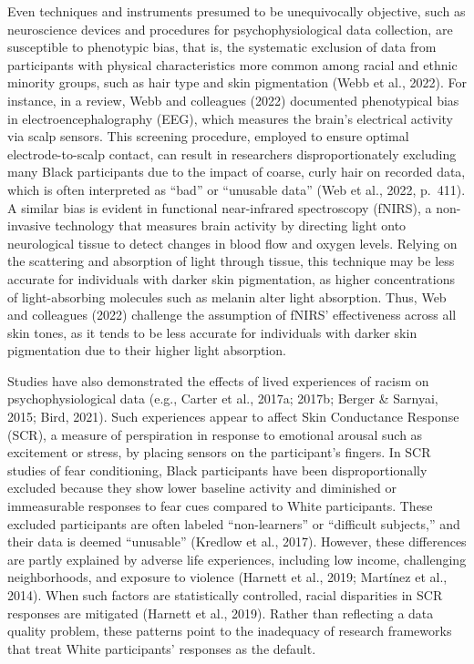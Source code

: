 \documentclass[
  11pt,
]{book}
\begin{document}
Even techniques and instruments presumed to be unequivocally objective, such as neuroscience devices and procedures for psychophysiological data collection, are susceptible to phenotypic bias, that is, the systematic exclusion of data from participants with physical characteristics more common among racial and ethnic minority groups, such as hair type and skin pigmentation (Webb et al., 2022). For instance, in a review, Webb and colleagues (2022) documented phenotypical bias in electroencephalography (EEG), which measures the brain's electrical activity via scalp sensors. This screening procedure, employed to ensure optimal electrode-to-scalp contact, can result in researchers disproportionately excluding many Black participants due to the impact of coarse, curly hair on recorded data, which is often interpreted as ``bad'' or ``unusable data'' (Web et al., 2022, p.~411). A similar bias is evident in functional near-infrared spectroscopy (fNIRS), a non-invasive technology that measures brain activity by directing light onto neurological tissue to detect changes in blood flow and oxygen levels. Relying on the scattering and absorption of light through tissue, this technique may be less accurate for individuals with darker skin pigmentation, as higher concentrations of light-absorbing molecules such as melanin alter light absorption. Thus, Web and colleagues (2022) challenge the assumption of fNIRS' effectiveness across all skin tones, as it tends to be less accurate for individuals with darker skin pigmentation due to their higher light absorption.

Studies have also demonstrated the effects of lived experiences of racism on psychophysiological data (e.g., Carter et al., 2017a; 2017b; Berger \& Sarnyai, 2015; Bird, 2021). Such experiences appear to affect Skin Conductance Response (SCR), a measure of perspiration in response to emotional arousal such as excitement or stress, by placing sensors on the participant's fingers. In SCR studies of fear conditioning, Black participants have been disproportionally excluded because they show lower baseline activity and diminished or immeasurable responses to fear cues compared to White participants. These excluded participants are often labeled ``non-learners'' or ``difficult subjects,'' and their data is deemed ``unusable'' (Kredlow et al., 2017). However, these differences are partly explained by adverse life experiences, including low income, challenging neighborhoods, and exposure to violence (Harnett et al., 2019; Martínez et al., 2014). When such factors are statistically controlled, racial disparities in SCR responses are mitigated (Harnett et al., 2019). Rather than reflecting a data quality problem, these patterns point to the inadequacy of research frameworks that treat White participants' responses as the default.
\end{document}
